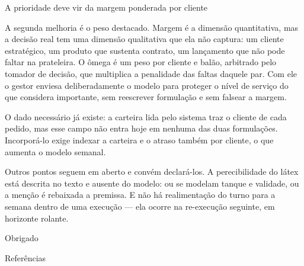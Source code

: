 \documentclass[11pt,aspectratio=169]{beamer}
\begin{document}
\begin{frame}{A prioridade deve vir da margem ponderada por cliente}
{  A segunda melhoria é o peso destacado. Margem é a dimensão quantitativa, mas a decisão real tem
  uma dimensão qualitativa que ela não captura: um cliente estratégico, um produto que sustenta
  contrato, um lançamento que não pode faltar na prateleira. O ômega é um peso por cliente e
  balão, arbitrado pelo tomador de decisão, que multiplica a penalidade das faltas daquele par.
  Com ele o gestor enviesa deliberadamente o modelo para proteger o nível de serviço do que
  considera importante, sem reescrever formulação e sem falsear a margem.

  O dado necessário já existe: a carteira lida pelo sistema traz o cliente de cada pedido, mas
  esse campo não entra hoje em nenhuma das duas formulações. Incorporá-lo exige indexar a carteira
  e o atraso também por cliente, o que aumenta o modelo semanal.

  Outros pontos seguem em aberto e convém declará-los. A perecibilidade do látex está descrita no
  texto e ausente do modelo: ou se modelam tanque e validade, ou a menção é rebaixada a premissa.
  E não há realimentação do turno para a semana dentro de uma execução — ela ocorre na re-execução
  seguinte, em horizonte rolante.}
\end{frame}

\begin{frame}[plain]
  \vfill
  \begin{center}
    {\Huge Obrigado}
  \end{center}
  \vfill
\end{frame}

\begin{frame}[allowframebreaks]{Referências}
  \scriptsize
  
\end{frame}
\end{document}
